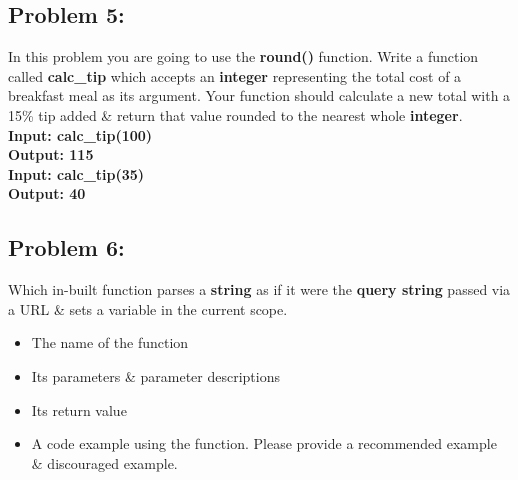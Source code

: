 \documentclass{article}
\begin{document}
\subsection*{Problem 5:}
In this problem you are going to use the \textbf{round()} function. Write a function called \textbf{calc\_tip} which accepts an \textbf{integer} representing the total cost of a breakfast meal as its argument. Your function should calculate a new total with a 15\% tip added \& return that value rounded to the nearest whole \textbf{integer}. \\

\textbf{Input: calc\_tip(100)} \\
\textbf{Output: 115} \\

\textbf{Input: calc\_tip(35)} \\
\textbf{Output: 40} 

\subsection*{Problem 6:}
Which in-built function parses a \textbf{string} as if it were the \textbf{query string} passed via a URL \& sets a variable in the current scope.

\begin{itemize}
    \item The name of the function
    \item Its parameters \& parameter descriptions
    \item Its return value
    \item A code example using the function. Please provide a recommended example \& discouraged example. 
\end{itemize}
\end{document}
